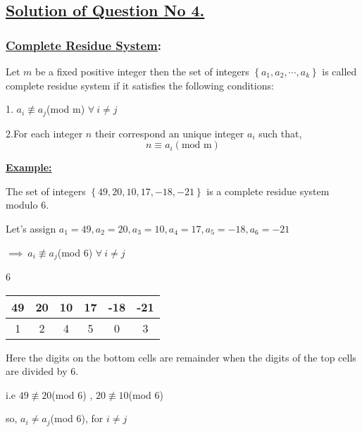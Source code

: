 \documentclass[a4paper,12pt]{article}
\begin{document}
    \subsection*{\underline{Solution of Question No 4.}}

    \subsubsection*{\underline{Complete Residue System}:}

    Let $m$ be a fixed positive integer then the set of integers $\left\{a_1,a_2,\cdots ,a_k\right\}$ is called complete residue system if it satisfies the following conditions:

    \vspace*{0.3cm}

    1. $a_i \not\equiv a_j$(mod m) $\forall\ i\neq j$

    \vspace*{0.2cm}
    2.For each integer $n$ their correspond an unique integer $a_i$ such that,
    $$n\equiv a_i (\mbox{mod m})$$

    \underline{{\bf Example:}}
    \vspace*{0.3cm}

    The set of integers $\left\{49,20,10,17,-18,-21\right\}$
    is a complete residue system modulo 6.

    Let's assign $a_1 = 49, a_2 = 20, a_3 = 10, a_4 = 17, a_5 = -18, a_6 = -21$

    \vspace*{0.2cm}
    $\implies\ a_i \not\equiv a_j$(mod 6)    $\forall\ i\neq j$

    \begin{center}
        6 \begin{tabular}{ |c|c|c|c|c|c| } 
            \hline  
        49 & 20 & 10 & 17 & -18 & -21 \\
        \hline
        1 & 2 & 4 & 5 & 0 & 3
        \end{tabular} 
    \end{center}

    Here the digits on the bottom cells are remainder when the digits of the top cells are divided by 6.

    \vspace*{0.3cm}

    i.e $49\not\equiv 20$(mod 6) ,  $20\not\equiv 10$(mod 6)

    so, $a_i\neq a_j$(mod 6),   for $i\neq j$

    \vspace*{0.3cm}
\end{document}
